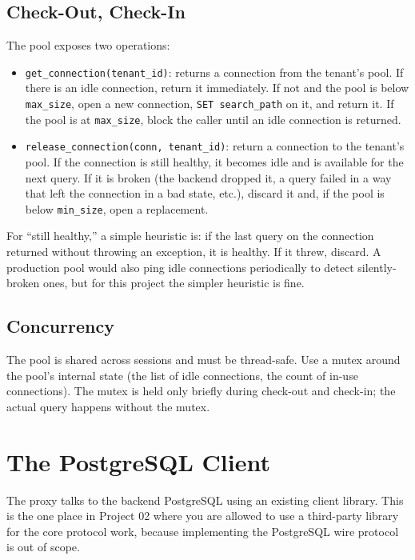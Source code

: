 \documentclass[11pt,a4paper]{article}
\begin{document}
\subsection{Check-Out, Check-In}
The pool exposes two operations:

\begin{itemize}
\item \texttt{get\_connection(tenant\_id)}: returns a connection from the tenant's pool. If there is an idle connection, return it immediately. If not and the pool is below \texttt{max\_size}, open a new connection, \texttt{SET search\_path} on it, and return it. If the pool is at \texttt{max\_size}, block the caller until an idle connection is returned.

\item \texttt{release\_connection(conn, tenant\_id)}: return a connection to the tenant's pool. If the connection is still healthy, it becomes idle and is available for the next query. If it is broken (the backend dropped it, a query failed in a way that left the connection in a bad state, etc.), discard it and, if the pool is below \texttt{min\_size}, open a replacement.
\end{itemize}

For ``still healthy,'' a simple heuristic is: if the last query on the connection returned without throwing an exception, it is healthy. If it threw, discard. A production pool would also ping idle connections periodically to detect silently-broken ones, but for this project the simpler heuristic is fine.

\subsection{Concurrency}
The pool is shared across sessions and must be thread-safe. Use a mutex around the pool's internal state (the list of idle connections, the count of in-use connections). The mutex is held only briefly during check-out and check-in; the actual query happens without the mutex.

\section{The PostgreSQL Client}

The proxy talks to the backend PostgreSQL using an existing client library. This is the one place in Project 02 where you are allowed to use a third-party library for the core protocol work, because implementing the PostgreSQL wire protocol is out of scope.
\end{document}
